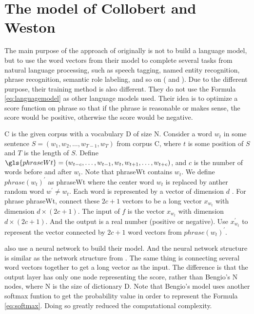 
\section{The model of Collobert and Weston}

The main purpose of the approach of \cite{CollobertWeston2008} originally is not to build a language model, but to use the word vectors from their model to complete several tasks from natural language processing, such as speech tagging, named entity recognition, phrase recognition, semantic role labeling, and so on (\citep{CollobertWeston2008} and \citep{CollobertWestonEtAl2011}). Due to the different purpose, their training method is also different. They do not use the Formula \ref{eq:languagemodel} as other language models used. Their idea is to optimize a score function on phrase so that if the phrase is reasonable or makes sense, the score would be positive, otherwise the score would be negative. 

\gls{C} is the given corpus with a vocabulary \gls{D} of size \gls{N}. Consider a word $w_t$ in some sentence $S = (w_1,w_2,\ldots,w_{T-1},w_{T})$ from corpus \gls{C}, where $t$ is some position of $S$ and $T$ is the length of $S$. Define $\gls{phraseWt} = (w_{t-c},\ldots,w_{t-1},w_t,w_{t+1},\ldots,w_{t+c})$, and $c$ is the number of words before and after $w_t$. Note that \gls{phraseWt} contains $w_t$. 
We define $phrase(w_t)^\prime$ as \gls{phraseWt} where the center word $w_t$ is replaced by  anther random word $w^\prime\not=w_t$. Each word is represented by a vector of dimension $d$ . For phrase \gls{phraseWt}, connect these $2c+1$ vectors to be a long vector $x_{w_t}$ with dimension $d \times (2c+1)$. The input of $f$ is the vector $x_{w_t}$ with dimension $d \times (2c+1)$. And the output is a real number (positive or negative). Use $x^\prime_{w_t}$ to represent the vector connected by $2c+1$ word vectors from $phrase(w_t)^\prime$.

\citep{CollobertWeston2008} also use a neural network to build their model. And the neural network structure is similar as the network structure from \citep{BengioDucharmeEtAl2003}. The same thing is  connecting several word vectors together to get a long vector as the input. The difference is that the output layer has only one node representing the score, rather than Bengio's \gls{N} nodes, where \gls{N} is the size of dictionary \gls{D}. Note that Bengio's model uses another softmax funtion to get the probability value in order to represent the Formula \ref{eq:softmax}. Doing so greatly reduced the computational complexity.


